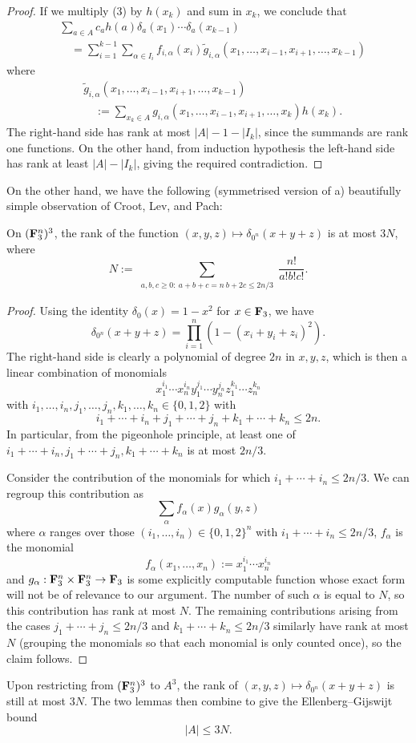 \begin{proof}
If we multiply (3) by $h(x_k)$ and sum in $x_k$, we conclude that
\[
\begin{split}
&\sum_{a\in A}c_ah(a)\delta_a(x_1)\cdots\delta_a(x_{k-1})\\
&\quad=\sum_{i=1}^{k-1}\sum_{\alpha\in I_i}f_{i,\alpha}(x_i)\tilde g_{i,\alpha}(x_1,\ldots,x_{i-1},x_{i+1},\ldots,x_{k-1})
\end{split}
\]
where
\[
\begin{split}
&\tilde g_{i,\alpha}(x_1,\ldots,x_{i-1},x_{i+1},\ldots,x_{k-1})\\
&\quad:=\sum_{x_k\in A}g_{i,\alpha}(x_1,\ldots,x_{i-1},x_{i+1},\ldots,x_k)h(x_k).
\end{split}
\]
The right-hand side has rank at most $|A|-1-|I_k|$, since the summands are rank one functions. On the other hand, from induction hypothesis the left-hand side has rank at least $|A|-|I_k|$, giving the required contradiction.
\end{proof}

On the other hand, we have the following (symmetrised version of a) beautifully simple observation of Croot, Lev, and Pach:
\begin{lemma}[2]
On $({\bf F}_3^n)^3$, the rank of the function $(x,y,z)\mapsto\delta_{0^n}(x+y+z)$ is at most $3N$, where
\[
N:=\sum_{\substack{a,b,c\ge0:\ a+b+c=n\ b+2c\le2n/3}}\frac{n!}{a!b!c!}.
\]
\end{lemma}
\begin{proof}
Using the identity $\delta_0(x)=1-x^2$ for $x\in{\bf F}_3$, we have
\[
\delta_{0^n}(x+y+z)=\prod_{i=1}^n(1-(x_i+y_i+z_i)^2).
\]
The right-hand side is clearly a polynomial of degree $2n$ in $x,y,z$, which is then a linear combination of monomials
\[
x_1^{i_1}\cdots x_n^{i_n}y_1^{j_1}\cdots y_n^{j_n}z_1^{k_1}\cdots z_n^{k_n}
\]
with $i_1,\ldots,i_n,j_1,\ldots,j_n,k_1,\ldots,k_n\in\{0,1,2\}$ with
\[
i_1+\cdots+i_n+j_1+\cdots+j_n+k_1+\cdots+k_n\le2n.
\]
In particular, from the pigeonhole principle, at least one of $i_1+\cdots+i_n,j_1+\cdots+j_n,k_1+\cdots+k_n$ is at most $2n/3$.

Consider the contribution of the monomials for which $i_1+\cdots+i_n\le2n/3$. We can regroup this contribution as
\[
\sum_\alpha f_\alpha(x)g_\alpha(y,z)
\]
where $\alpha$ ranges over those $(i_1,\ldots,i_n)\in\{0,1,2\}^n$ with $i_1+\cdots+i_n\le2n/3$, $f_\alpha$ is the monomial
\[
f_\alpha(x_1,\ldots,x_n):=x_1^{i_1}\cdots x_n^{i_n}
\]
and $g_\alpha:{\bf F}_3^n\times{\bf F}_3^n\to{\bf F}_3$ is some explicitly computable function whose exact form will not be of relevance to our argument. The number of such $\alpha$ is equal to $N$, so this contribution has rank at most $N$. The remaining contributions arising from the cases $j_1+\cdots+j_n\le2n/3$ and $k_1+\cdots+k_n\le2n/3$ similarly have rank at most $N$ (grouping the monomials so that each monomial is only counted once), so the claim follows.
\end{proof}

Upon restricting from $({\bf F}_3^n)^3$ to $A^3$, the rank of $(x,y,z)\mapsto\delta_{0^n}(x+y+z)$ is still at most $3N$. The two lemmas then combine to give the Ellenberg--Gijswijt bound
\[
|A|\le3N.
\]
